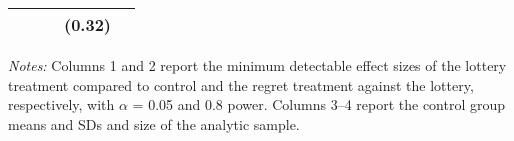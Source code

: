 \begin{table}[h]
{\begin{threeparttable}
\begin{tabular}{l*{4}{c}}
          &         &         &   (0.32)&         \\
\bottomrule \end{tabular} \begin{tablenotes}[flushleft] \footnotesize \item \emph{Notes:} Columns 1 and 2 report the minimum detectable effect sizes of the lottery treatment compared to control and the regret treatment against the lottery, respectively, with \(\alpha\) = 0.05 and 0.8 power. Columns 3--4 report the control group means and SDs and size of the analytic sample. \end{tablenotes} \end{threeparttable} } \end{table}
